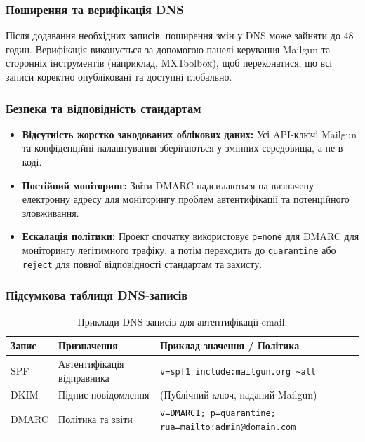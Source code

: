 \subsubsection{Поширення та верифікація DNS}

Після додавання необхідних записів, поширення змін у DNS може зайняти до 48 годин. Верифікація виконується за допомогою панелі керування Mailgun та сторонніх інструментів (наприклад, MXToolbox), щоб переконатися, що всі записи коректно опубліковані та доступні глобально.

\subsubsection{Безпека та відповідність стандартам}

\begin{itemize}
    \item \textbf{Відсутність жорстко закодованих облікових даних:} Усі API-ключі Mailgun та конфіденційні налаштування зберігаються у змінних середовища, а не в коді.
    \item \textbf{Постійний моніторинг:} Звіти DMARC надсилаються на визначену електронну адресу для моніторингу проблем автентифікації та потенційного зловживання.
    \item \textbf{Ескалація політики:} Проект спочатку використовує \texttt{p=none} для DMARC для моніторингу легітимного трафіку, а потім переходить до \texttt{quarantine} або \texttt{reject} для повної відповідності стандартам та захисту.
\end{itemize}

\subsubsection{Підсумкова таблиця DNS-записів}

\begin{table}[h!]
\centering
\begin{tabular}{|l|l|l|}
\hline
\textbf{Запис} & \textbf{Призначення} & \textbf{Приклад значення / Політика} \\
\hline
SPF    & Автентифікація відправника & \texttt{v=spf1 include:mailgun.org \~{}all} \\
DKIM   & Підпис повідомлення & (Публічний ключ, наданий Mailgun) \\
DMARC  & Політика та звіти & \texttt{v=DMARC1; p=quarantine; rua=mailto:admin@domain.com} \\
\hline
\end{tabular}
\caption{Приклади DNS-записів для автентифікації email.}
\label{tab:dns_records_email}
\end{table}

